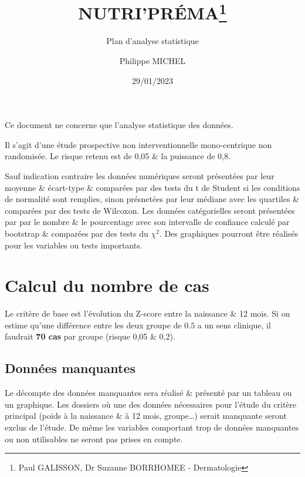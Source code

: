 \documentclass[
  10 pt,
  a4paperpaper,
  french]{scrartcl}
\title{NUTRI'PRÉMA\thanks{Paul GALISSON, Dr Suzanne BORRHOMEE -
Dermatologie}}
\subtitle{Plan d'analyse statistique}
\author{Philippe MICHEL}
\date{29/01/2023}
\begin{document}
\maketitle
\ifdefined\Shaded\renewenvironment{Shaded}{\begin{tcolorbox}[boxrule=0pt, interior hidden, enhanced, borderline west={3pt}{0pt}{shadecolor}, frame hidden, breakable, sharp corners]}{\end{tcolorbox}}\fi

Ce document ne concerne que l'analyse statistique des données.

Il s'agit d'une étude prospective non interventionnelle mono-centrique
non randomisée. Le risque \textalpha{} retenu est de 0,05 \& la
puissance de 0,8.

Sauf indication contraire les données numériques seront présentées par
leur moyenne \& écart-type \& comparées par des tests du t de Student si
les conditions de normalité sont remplies, sinon présnetées par leur
médiane avec les quartiles \& comparées par des tests de Wilcoxon. Les
données catégorielles seront présentées par par le nombre \& le
pourcentage avec son intervalle de confiance calculé par bootstrap \&
comparées par des tests du \(\chi^2\). Des graphiques pourront être
réalisés pour les variables ou tests importants.

\hypertarget{calcul-du-nombre-de-cas}{%
\section{Calcul du nombre de cas}\label{calcul-du-nombre-de-cas}}

Le critère de base est l'évolution du Z-score entre la naissance \& 12
mois. Si on estime qu'une différence entre les deux groupe de
\(\num{0.5}\) a un sens clinique, il faudrait \textbf{70 cas} par groupe
(risque \textalpha{} 0,05 \& \textbeta{} 0,2).

\hypertarget{donnuxe9es-manquantes}{%
\subsection{Données manquantes}\label{donnuxe9es-manquantes}}

Le décompte des données manquantes sera réalisé \& présenté par un
tableau ou un graphique. Les dossiers où une des données nécessaires
pour l'étude du critère principal (poids à la naissance \& à 12 mois,
groupe\ldots) serait manquante seront exclus de l'étude. De même les
variables comportant trop de données manquantes ou non utilisables ne
seront pas prises en compte.
\end{document}
